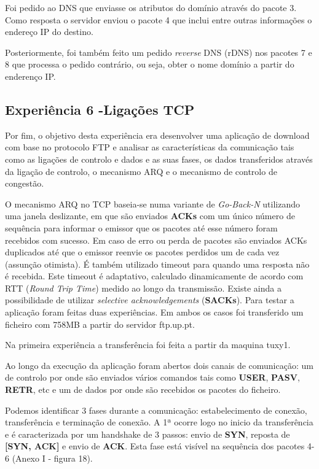 \documentclass[a4paper, 11pt]{article}
\begin{document}
Foi pedido ao DNS que enviasse os atributos do domínio através do pacote 3. Como resposta o servidor enviou o pacote 4 que inclui entre outras informações o endereço IP do destino.

Posteriormente, foi também feito um pedido \textit{reverse} DNS (rDNS) nos pacotes 7 e 8 que processa o pedido contrário, ou seja, obter o nome domínio a partir do enderenço IP.

\subsection{Experiência 6 -Ligações  TCP}

Por fim, o objetivo desta experiência era desenvolver uma aplicação de download com base no protocolo FTP e analisar as características da comunicação tais como as ligações de controlo e dados e as suas fases, os dados transferidos através da ligação de controlo, o mecanismo ARQ e o mecanismo de controlo de congestão.

O mecanismo ARQ no TCP baseia-se numa variante de \textit{Go-Back-N} utilizando uma janela deslizante, em que são enviados \textbf{ACKs} com um único número de sequência para informar o emissor que os pacotes até esse número foram recebidos com sucesso. Em caso de erro ou perda de pacotes são enviados ACKs duplicados até que o emissor reenvie os pacotes perdidos um de cada vez (assunção otimista). É também utilizado timeout para quando uma resposta não é recebida. Este timeout é adaptativo, calculado dinamicamente de acordo com RTT (\textit{Round Trip Time}) medido ao longo da transmissão. Existe ainda a possibilidade de utilizar \textit{selective acknowledgements} (\textbf{SACKs}).
Para testar a aplicação foram feitas duas experiências. Em ambos os casos foi transferido um ficheiro com 758MB a partir do servidor ftp.up.pt.

Na primeira experiência a transferência foi feita a partir da maquina tuxy1.

Ao longo da execução da aplicação foram abertos dois canais de comunicação: um de controlo por onde são enviados vários comandos tais como \textbf{USER}, \textbf{PASV}, \textbf{RETR}, etc e um de dados por onde são recebidos os pacotes do ficheiro.

Podemos identificar 3 fases durante a comunicação: estabelecimento de conexão, transferência e terminação de conexão.
 A 1ª ocorre logo no inicio da transferência e é caracterizada por um handshake de 3 passos: envio de \textbf{SYN}, reposta de \textbf{[SYN, ACK]} e envio de \textbf{ACK}. Esta fase está visível na sequência dos pacotes 4-6 (Anexo I - figura 18).\\
\end{document}
